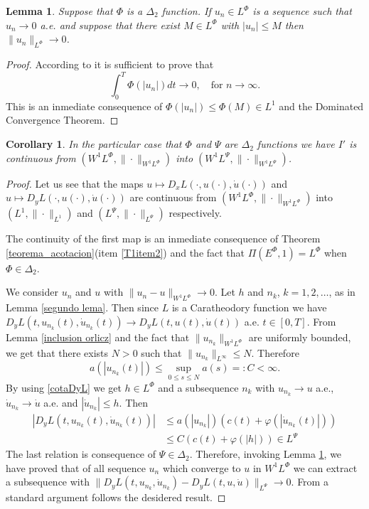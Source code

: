 \documentclass[twoside]{article}
\newtheorem{cor}[thm]{Corollary}
\newtheorem{lem}[thm]{Lemma}
\newcommand{\orlnor}{\|_{L^{\Phi}}}
\newcommand{\lphi}{L^{\Phi}}
\newcommand{\lpsi}{L^{\Psi}}
\newcommand{\ephi}{E^{\Phi}}
\newcommand{\wphi}{W^{1}\lphi}
\newcommand{\sobnor}{\|_{W^{1}\lphi}}
\begin{document}
\begin{lem}\label{lema_conv_may}
Suppose that $\Phi$ is a $\Delta_2$ function.  If $u_n \in\lphi$ is a sequence such that $u_n\to 0$ a.e. and suppose that there exist $M\in\lphi$ with $|u_n|\leq M$
then $\|u_n\orlnor\to 0$. 
\end{lem}
\begin{proof}
 According to \cite[Theorem 9.4]{KR} it is sufficient to prove that
 \[\int_0^T\Phi(|u_n|)dt\to 0,\quad\text{for }n\to\infty.\]
 This is an inmediate consequence of $\Phi(|u_n|)\leq \Phi(M)\in L^1$ and the Dominated Convergence Theorem. 
\end{proof}


\begin{cor}
  In the particular case that $\Phi$ and $\Psi$ are $\Delta_2$ functions we have
  $I'$ is continuous from $(\wphi,\|\cdot\sobnor)$ into $(W^{1}L^{\Psi},\|\cdot \|_{W^{1}L^{\Psi}})$. 
\end{cor}

\begin{proof}
Let us see that the maps $u\mapsto D_xL(\cdot,u(\cdot),\dot{u}(\cdot))$  and $u\mapsto D_yL(\cdot,u(\cdot),\dot{u}(\cdot))$  are continuous 
from $\left(\wphi, \|\cdot \sobnor\right) $ into $\left( L^1, \|\cdot \|_{L^1}\right)$ and 
 $\left(\lpsi,\|\cdot\|_{L^{\Psi}}\right)$ respectively.
 
 The continuity of the first map is an inmediate consequence of Theorem \ref{teorema_acotacion}(item \ref{T1item2}) and the fact that $\Pi(\ephi,1) =\lphi$ 
 when $\Phi\in\Delta_2$. 
 
 We consider $u_n$ and $u$ with $\|u_n- u\sobnor\to 0$.  Let $h$ and $n_k$, $k=1,2,\ldots$, as in Lemma \ref{segundo lema}. Then  since $L$ is a Caratheodory function
 we have $ D_yL(t,u_{n_k}(t),\dot{u}_{n_k}(t))\to D_yL(t,u(t),\dot{u}(t))$ a.e. $t\in [0,T]$.  From Lemma \ref{inclusion orlicz} and the fact that $\|u_{n_k}\sobnor$ are uniformly bounded, we get that there exists $N>0$ such that 
 $\|u_{n_k}\|_{L^{\infty}}\leq N$. Therefore
  \[a(|u_{n_k}(t)|)\leq \sup_{0\leq s\leq N} a(s)=:C<\infty.\]
 By using \eqref{cotaDyL} we get $h\in\lphi$ and a subsequence $n_k$ with $u_{n_k}\to u$ a.e., $\dot{u}_{n_k}\to \dot{u}$ a.e. and  $|\dot{u}_{n_k}|\leq h$. Then
 \[\begin{split}
    |D_yL(t,u_{n_k}(t),\dot{u}_{n_k}(t))| &\leq a(|u_{n_k}|)\left( c(t) + \varphi (|\dot{u}_{n_k}(t)|)\right)\\
    &\leq C\left( c(t) + \varphi (|h|)\right)\in \lpsi
   \end{split}
\]
The last relation is consequence of $\Psi\in\Delta_2$. Therefore, invoking  Lemma \ref{lema_conv_may}, we have proved that 
  of all sequence $u_n$ which converge to $u$ in $\wphi$ we can 
extract a subsequence with $\|D_yL(t,u_{n_k},\dot{u}_{n_k})-D_yL(t,u,\dot{u})\|_{\lpsi}\to 0$. From a standard argument follows the desidered result. 

\end{proof}
\end{document}
